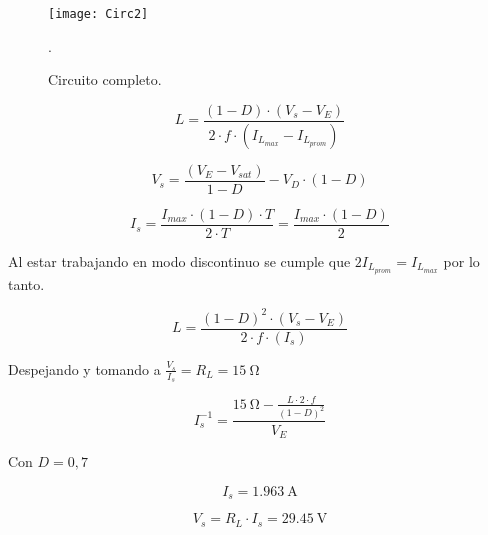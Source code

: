 \begin{figure}[H]
	\centering
	\texttt{[image: Circ2]}
	\caption{Circuito completo.}.
	\label{fig:Circ2}
\end{figure}



\begin{equation}
	{L} = \frac{(1-D) \cdot (V_s - V_E)}{2 \cdot f \cdot (I_{L_{max}} - I_{L_{prom}})}
\end{equation}

\begin{equation}
	V_s = \frac{(V_E - V_{sat})}{1-D} - V_D \cdot (1 - D) 
	\label{ec:Nose}
\end{equation}


\begin{equation}
	I_s = \frac{I_{max} \cdot (1-D) \cdot T}{2 \cdot T} = \frac{I_{max} \cdot (1 - D)}{2} 
\end{equation}

Al estar trabajando en modo discontinuo se cumple que $ 2 I_{L_{prom}} =I_{L_{max}} $ por lo tanto.



\begin{equation}
	L = \frac{(1 - D)^2 \cdot (V_s - V_E)}{2 \cdot f \cdot (I_s)}
\end{equation}

Despejando y tomando a $\frac{V_s}{I_s} = R_L = \SI{15}{\ohm}$



\begin{equation}
	I_s^{-1} = \frac{\SI{15}{\ohm} - \frac{L \cdot 2 \cdot f}{(1-D)^2}}{V_E}
\end{equation}



Con $D=0,7$


\begin{equation}
	\boxed{I_s = \SI{1,963}{\ampere}}
\end{equation}


\begin{equation}
	\boxed{V_s = R_L \cdot I_s = \SI{29,45}{\volt}}
\end{equation}